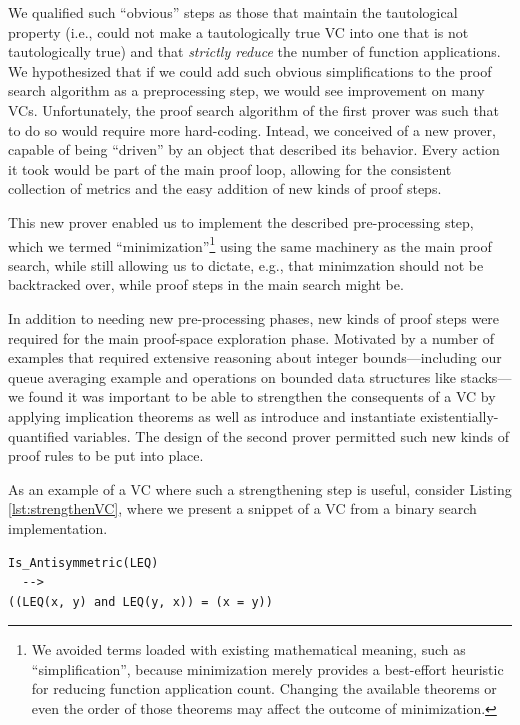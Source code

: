 We qualified such ``obvious'' steps as those that maintain the tautological property (i.e., could not make a tautologically true VC into one that is not tautologically true) and that \emph{strictly reduce} the number of function applications.  We hypothesized that if we could add such obvious simplifications to the proof search algorithm as a preprocessing step, we would see improvement on many VCs.  Unfortunately, the proof search algorithm of the first prover was such that to do so would require more hard-coding.  Intead, we conceived of a new prover, capable of being ``driven'' by an object that described its behavior.  Every action it took would be part of the main proof loop, allowing for the consistent collection of metrics and the easy addition of new kinds of proof steps.

This new prover enabled us to implement the described pre-processing step, which we termed ``minimization''\footnote{We avoided terms loaded with existing mathematical meaning, such as ``simplification'', because minimization merely provides a best-effort heuristic for reducing function application count.  Changing the available theorems or even the order of those theorems may affect the outcome of minimization.} using the same machinery as the main proof search, while still allowing us to dictate, e.g., that minimzation should not be backtracked over, while proof steps in the main search might be.

In addition to needing new pre-processing phases, new kinds of proof steps were required for the main proof-space exploration phase.  Motivated by a number of examples that required extensive reasoning about integer bounds---including our queue averaging example and operations on bounded data structures like stacks---we found it was important to be able to strengthen the consequents of a VC by applying implication theorems as well as introduce and instantiate existentially-quantified variables.  The design of the second prover permitted such new kinds of proof rules to be put into place.

As an example of a VC where such a strengthening step is useful, consider Listing \ref{lst:strengthenVC}, where we present a snippet of a VC from a binary search implementation.

\begin{lstlisting}[float=h,language=resolve,caption={A VC for which strenthening the consequent is useful\label{lst:strengthenVC}}]
Is_Antisymmetric(LEQ)
  -->
((LEQ(x, y) and LEQ(y, x)) = (x = y))
\end{lstlisting}

